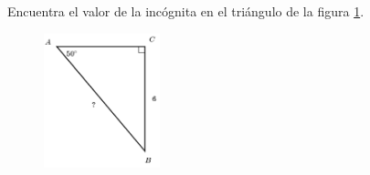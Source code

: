 \question[15]  Encuentra el valor de la incógnita en el triángulo de la figura \ref{fig:lados_functrig_08}.
\begin{figure}[H]
    \begin{center}
        \includegraphics[width=0.3\textwidth]{../images/lados_functrig_08.png}
    \end{center}
    \caption{}
    \label{fig:lados_functrig_08}
\end{figure}